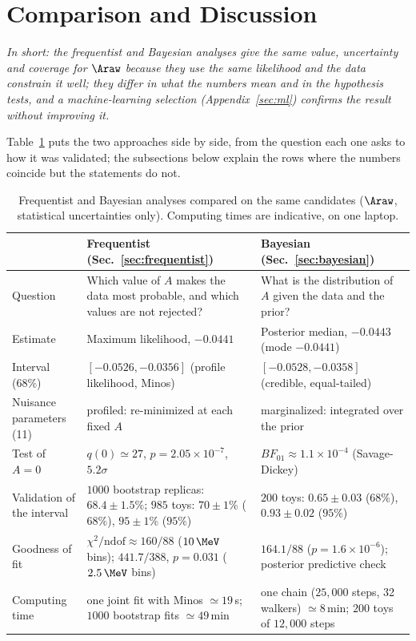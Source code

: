 \section{Comparison and Discussion}
\label{sec:comparison}
\emph{In short: the frequentist and Bayesian analyses give the same value, uncertainty and coverage for $\Araw$ because they use the same likelihood and the data constrain it well; they differ in what the numbers mean and in the hypothesis tests, and a machine-learning selection (Appendix~\ref{sec:ml}) confirms the result without improving it.}

\label{sec:comparison_summary}
Table~\ref{tab:comparison} puts the two approaches side by side, from the question each one asks to how it was validated; the subsections below explain the rows where the numbers coincide but the statements do not.
\begin{table}[t]
\centering
\small
\begin{tabular}{p{2.6cm}p{6.6cm}p{6.6cm}}
\toprule
 & Frequentist (Sec.~\ref{sec:frequentist}) & Bayesian (Sec.~\ref{sec:bayesian}) \\
\midrule
Question & Which value of $A$ makes the data most probable, and which values are not rejected? & What is the distribution of $A$ given the data and the prior? \\
Estimate & Maximum likelihood, $-0.0441$ & Posterior median, $-0.0443$ (mode $-0.0441$) \\
Interval (68\%) & $[-0.0526,-0.0356]$ (profile likelihood, Minos) & $[-0.0528,-0.0358]$ (credible, equal-tailed) \\
Nuisance parameters (11) & profiled: re-minimized at each fixed $A$ & marginalized: integrated over the prior \\
Test of $A=0$ & $q(0)\simeq27$, $p=2.05\times10^{-7}$, $5.2\sigma$ & $BF_{01}\approx1.1\times10^{-4}$ (Savage-Dickey) \\
Validation of the interval & $1000$ bootstrap replicas: $68.4\pm1.5\%$; $985$ toys: $70\pm1\%$ ($68\%$), $95\pm1\%$ ($95\%$) & $200$ toys: $0.65\pm0.03$ ($68\%$), $0.93\pm0.02$ ($95\%$) \\
Goodness of fit & $\chi^2/\mathrm{ndof}\approx160/88$ ($10\,\MeV$ bins); $441.7/388$, $p=0.031$ ($2.5\,\MeV$ bins) & $164.1/88$ ($p=1.6\times10^{-6}$); posterior predictive check \\
Computing time & one joint fit with Minos $\simeq19\,$s; $1000$ bootstrap fits $\simeq49\,$min & one chain ($25{,}000$ steps, 32 walkers) $\simeq8\,$min; $200$ toys of $12{,}000$ steps \\
\bottomrule
\end{tabular}
\caption{Frequentist and Bayesian analyses compared on the same candidates ($\Araw$, statistical uncertainties only). Computing times are indicative, on one laptop.}
\label{tab:comparison}
\end{table}




